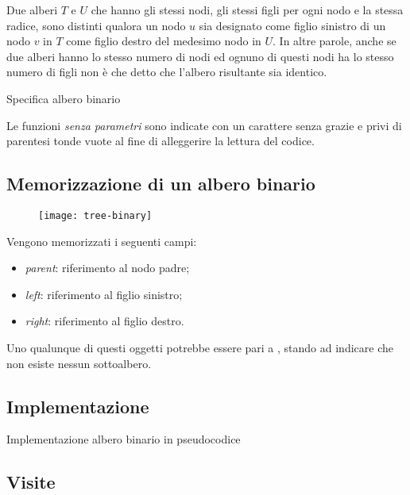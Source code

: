 \begin{note}
Due alberi \(T\) e \(U\) che hanno gli stessi nodi, gli stessi figli per ogni nodo e la stessa radice, sono distinti qualora un nodo \(u\) sia designato come figlio sinistro di un nodo \(v\) in \(T\) come figlio destro del medesimo nodo in \(U\).
In altre parole, anche se due alberi hanno lo stesso numero di nodi ed ognuno di questi nodi ha lo stesso numero di figli non è che detto che l'albero risultante sia identico.
\end{note}

\begin{algorithm}[H]
	\caption{Specifica albero binario}
	
\end{algorithm}

\begin{note}
Le funzioni \emph{senza parametri} sono indicate con un carattere senza grazie e privi di parentesi tonde vuote al fine di alleggerire la lettura del codice.
\end{note}

\subsection{Memorizzazione di un albero binario}

\begin{figure}[H]
	\centering
	\texttt{[image: tree-binary]}
\end{figure}

Vengono memorizzati i seguenti campi:
\begin{itemize}
	\item \emph{parent}: riferimento al nodo padre;
	\item \emph{left}: riferimento al figlio sinistro;
	\item \emph{right}: riferimento al figlio destro.
\end{itemize}
Uno qualunque di questi oggetti potrebbe essere pari a \Nil, stando ad indicare che non esiste nessun sottoalbero.

\subsection{Implementazione}

\begin{algorithm}[H]
	\caption{Implementazione albero binario in pseudocodice}
	
\end{algorithm}

\subsection{Visite}

